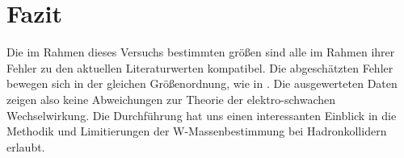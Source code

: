 \documentclass[a4paper,12pt]{article}
\begin{document}
\section{Fazit}
Die im Rahmen dieses Versuchs bestimmten größen sind alle im Rahmen ihrer Fehler zu den aktuellen Literaturwerten kompatibel. Die abgeschätzten Fehler
bewegen sich in der gleichen Größenordnung, wie in \cite{Abachi:1996ey}. Die ausgewerteten Daten zeigen also keine Abweichungen zur Theorie der 
elektro-schwachen Wechselwirkung. Die Durchführung hat uns einen interessanten Einblick in die Methodik und Limitierungen der W-Massenbestimmung bei
Hadronkollidern erlaubt.

{}
\end{document}
